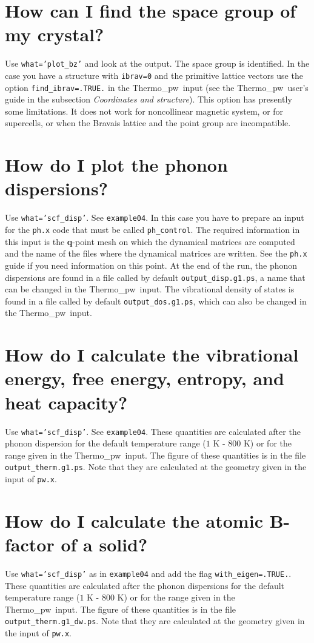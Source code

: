 \documentclass[12pt,a4paper,twoside]{report}
\def\thermo{{\sc Thermo}\_{\sc pw}}
\begin{document}
\newpage
{\color{coral}\section{How can I find the space group of my crystal?}}
\color{black}
Use \texttt{what='plot\_bz'} and look at the output. The space group is
identified. In the case you have a structure with \texttt{ibrav=0} and
the primitive lattice vectors use the option \texttt{find\_ibrav=.TRUE.} 
in the \thermo\ input (see the \thermo\ user's guide 
in the subsection
{\it Coordinates and structure}). This option has presently some limitations.
It does not work for noncollinear magnetic system, or for supercells, or
when the Bravais lattice and the point group are incompatible.

\newpage
{\color{coral}\section{How do I plot the phonon dispersions?}}
\color{black}
Use \texttt{what='scf\_disp'}. See \texttt{example04}. In this case you
have to prepare an input for the \texttt{ph.x} code that must be
called \texttt{ph\_control}. The required information in this input
is the {\bf q}-point mesh on which the dynamical matrices are computed
and the name of the files where the dynamical matrices are written.
See the \texttt{ph.x} guide if you need information on this point.
At the end of the run, the phonon dispersions are found in a file 
called by default \texttt{output\_disp.g1.ps},
a name that can be changed in the \thermo\ input.
The vibrational density of states is found in a file called by default
\texttt{output\_dos.g1.ps}, which can also be changed in the \thermo\ input.

\newpage
{\color{coral}\section{How do I calculate the vibrational energy, 
free energy, entropy, and heat capacity?}}
\color{black}
Use \texttt{what='scf\_disp'}. See \texttt{example04}. These quantities
are calculated after the phonon dispersion for the default 
temperature range ($1$ K - $800$ K) or for the range
given in the \thermo\ input. The figure of these quantities is in the file 
\texttt{output\_therm.g1.ps}.
Note that they are calculated at the geometry given in the input
of \texttt{pw.x}.

\newpage
{\color{coral}\section{How do I calculate the atomic B-factor of a solid?}}
\color{black}
Use \texttt{what='scf\_disp'} as in \texttt{example04} and add the
flag \texttt{with\_eigen=.TRUE.}. These quantities
are calculated after the phonon dispersions for the default 
temperature range ($1$ K - $800$ K) or for the range
given in the \thermo\ input. The figure of these quantities is in the file 
\texttt{output\_therm.g1\_dw.ps}.
Note that they are calculated at the geometry given in the input
of \texttt{pw.x}.
\end{document}
